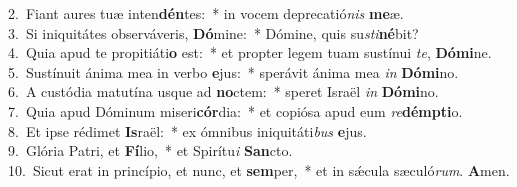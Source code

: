 {2.~}Fiant aures tuæ inten\textbf{dén}tes:~* in vocem deprecatió\textit{nis} \textbf{me}æ.\\
{3.~}Si iniquitátes observáveris, \textbf{Dó}mine:~* Dómine, quis su\textit{sti}\textbf{né}bit?\\
{4.~}Quia apud te propitiáti\textbf{o} est:~* et propter legem tuam sustínui \textit{te}, \textbf{Dó}\textbf{mi}ne.\\
{5.~}Sustínuit ánima mea in verbo \textbf{e}jus:~* sperávit ánima mea \textit{in} \textbf{Dó}\textbf{mi}no.\\
{6.~}A custódia matutína usque ad \textbf{no}ctem:~* speret Israël \textit{in} \textbf{Dó}\textbf{mi}no.\\
{7.~}Quia apud Dóminum miseri\textbf{cór}dia:~* et copiósa apud eum \textit{re}\textbf{dém}\textbf{pti}o.\\
{8.~}Et ipse rédimet \textbf{Is}raël:~* ex ómnibus iniquitáti\textit{bus} \textbf{e}jus.\\
{9.~}Glória Patri, et \textbf{Fí}lio,~* et Spirítu\textit{i} \textbf{San}cto.\\
{10.~}Sicut erat in princípio, et nunc, et \textbf{sem}per,~* et in sǽcula sæculó\textit{rum}. \textbf{A}men.\\
